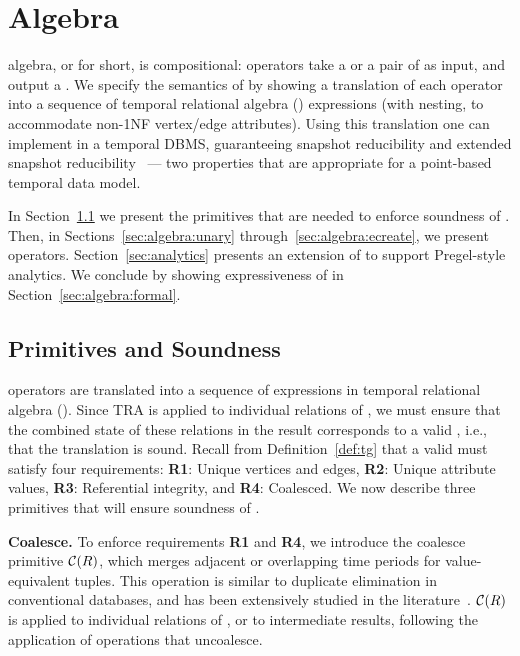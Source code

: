 \section{Algebra}
\label{sec:algebra}
\setlength{\textfloatsep}{5pt}%

\tg algebra, or \tga for short, is compositional: operators take a \tg
or a pair of \tgs as input, and output a \tg.  We specify the
semantics of \tga by showing a translation of each operator into a
sequence of temporal relational algebra (\tra) expressions (with
nesting, to accommodate non-1NF vertex/edge attributes).  Using this
translation one can implement \tga in a temporal DBMS, guaranteeing
snapshot reducibility and extended snapshot
reducibility~\cite{DBLP:reference/db/Bohlen092} --- two properties
that are appropriate for a point-based temporal data model.



In Section~\ref{sec:algebra:integrity} we present the primitives that
are needed to enforce soundness of \tga.  Then, in
Sections~\ref{sec:algebra:unary} through~\ref{sec:algebra:ecreate}, we
present \tga operators.  Section~\ref{sec:analytics} presents an
extension of \tga to support Pregel-style analytics.  We conclude by
showing expressiveness of \tga in Section~\ref{sec:algebra:formal}.

\subsection{Primitives and Soundness}
\label{sec:algebra:integrity}

\tga operators are translated into a sequence of expressions in
temporal relational algebra (\tra).  Since TRA is applied to
individual relations of \tve, we must ensure that the combined state
of these relations in the result corresponds to a valid \tg, i.e.,
that the translation is sound.  Recall from Definition~\ref{def:tg}
that a valid \tg must satisfy four requirements: {\bf R1}: Unique
vertices and edges, {\bf R2}: Unique attribute values, {\bf R3}:
Referential integrity, and {\bf R4}: Coalesced.  We now describe three
primitives that will ensure soundness of \tga.

{\bf Coalesce.} To enforce requirements {\bf R1} and {\bf R4}, we
introduce the coalesce primitive $\mathcal{C}(R)$, which merges adjacent or
overlapping time periods for value-equivalent tuples.  This operation
is similar to duplicate elimination in conventional databases, and has
been extensively studied in the
literature~\cite{DBLP:conf/vldb/BohlenSS96,DBLP:journals/sigmod/Zimanyi06}.
$\mathcal{C}(R)$ is applied to individual relations of \tve, or to
intermediate results, following the application of operations that
uncoalesce.

